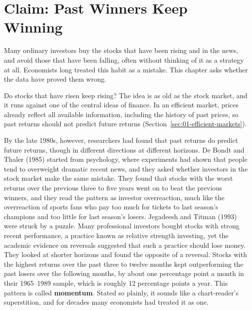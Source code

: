 \makeatletter
{}
\makeatother

\chapter{Claim: Past Winners Keep Winning}
\label{ch:05}

Many ordinary investors buy the stocks that have been rising and in the news, and avoid those that have been falling, often without thinking of it as a strategy at all. Economists long treated this habit as a mistake. This chapter asks whether the data have proved them wrong.

Do stocks that have risen keep rising? The idea is as old as the stock market, and it runs against one of the central ideas of finance. In an efficient market, prices already reflect all available information, including the history of past prices, so past returns should not predict future returns (Section~\ref{sec:01-efficient-markets}). 

By the late 1980s, however, researchers had found that past returns do predict future returns, though in different directions at different horizons. De Bondt and Thaler (1985) started from psychology, where experiments had shown that people tend to overweight dramatic recent news, and they asked whether investors in the stock market make the same mistake. They found that stocks with the worst returns over the previous three to five years went on to beat the previous winners, and they read the pattern as investor overreaction, much like the overreaction of sports fans who pay too much for tickets to last season's champions and too little for last season's losers. Jegadeesh and Titman (1993) were struck by a puzzle. Many professional investors bought stocks with strong recent performance, a practice known as relative strength investing, yet the academic evidence on reversals suggested that such a practice should lose money. They looked at shorter horizons and found the opposite of a reversal. Stocks with the highest returns over the past three to twelve months kept outperforming the past losers over the following months, by about one percentage point a month in their 1965--1989 sample, which is roughly 12 percentage points a year. This pattern is called \textbf{momentum}. Stated so plainly, it sounds like a chart-reader's superstition, and for decades many economists had treated it as one.

